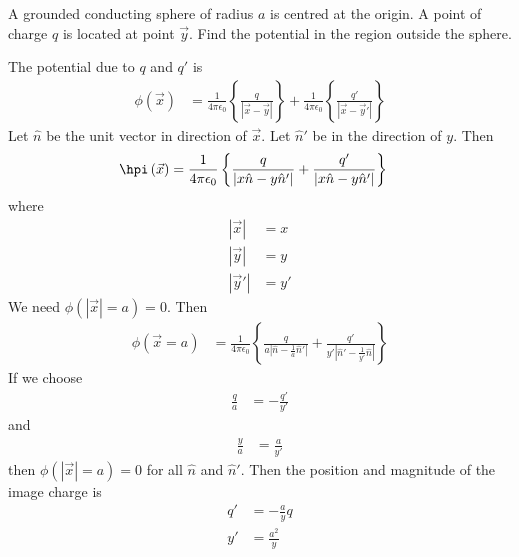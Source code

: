 \begin{example}
    A grounded conducting sphere of radius $a$ is centred at the origin.
    A point of charge $q$ is located at point $\vec{y}$.
    Find the potential in the region outside the sphere.
\end{example}
The potential due to $q$ and $q'$ is
\begin{align}
    \phi(\vec{x})
    &=
    \frac{1}{4\pi\epsilon_0}
    \left\{ 
    \frac{q}{\left| \vec{x} - \vec{y} \right|}
    \right\}
    +
    \frac{1}{4\pi\epsilon_0}
    \left\{ 
    \frac{q'}{\left| \vec{x} - \vec{y}' \right|}
    \right\}
\end{align}
Let $\hat{n}$ be the unit vector in direction of $\vec{x}$.
Let $\hat{n}'$ be in the direction of $y$.
Then
\begin{align}
    \hpi\left( \vec{x} \right)
    &=
    \frac{1}{4\pi\epsilon_0}\left\{ 
    \frac{q}{\left| x\hat{n} - y\hat{n}'\right|}
    + \frac{q'}{\left| x\hat{n} - y\hat{n}'\right|}
    \right\}
\end{align}
where
\begin{align}
    |\vec{x}| &= x\\
    |\vec{y}| &= y\\
    |\vec{y}'| &= y'
\end{align}
We need $\phi\left( |\vec{x}| = a \right) = 0$.
Then
\begin{align}
    \phi(\vec{x}=a)
    &=
    \frac{1}{4\pi\epsilon_0}
    \left\{ 
    \frac{q}{a\left| \hat{n} - \frac{1}{a} \hat{n}'\right|}
    + \frac{q'}{y'\left| \hat{n}' - \frac{1}{y'} \hat{n}\right|}
    \right\}
\end{align}
If we choose
\begin{align}
    \frac{q}{a}
    &=
    - \frac{q'}{y'}
\end{align}
and
\begin{align}
    \frac{y}{a} &= \frac{a}{y'}
\end{align}
then $\phi\left( |\vec{x}| = a \right) = 0$
for all $\hat{n}$ and $\hat{n}'$.
Then the position and magnitude of the image charge is
\begin{align}
    q' &= -\frac{a}{y}q\\
    y' &= \frac{a^2}{y}
\end{align}
